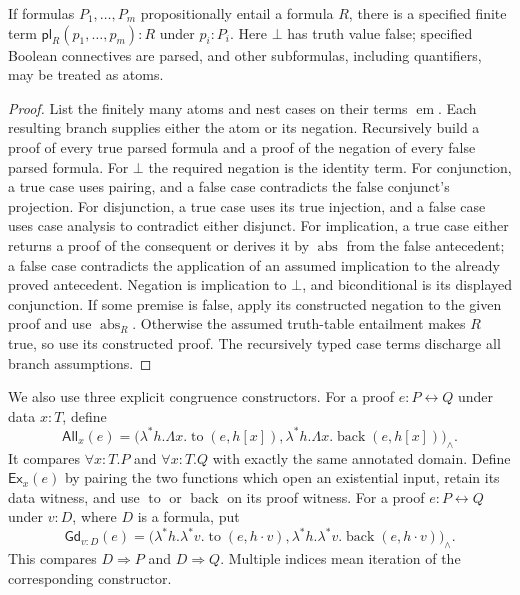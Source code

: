 \begin{lemma}
\label{lem:enc-propositional}
If formulas $P_1,\ldots,P_m$ propositionally entail a formula $R$, there
is a specified finite term
$\mathsf{pl}_R(p_1,\ldots,p_m):R$ under $p_i:P_i$.
Here $\bot$ has truth value false; specified Boolean connectives are
parsed, and other subformulas, including quantifiers, may be treated as
atoms.
\end{lemma}
\begin{proof}
List the finitely many atoms and nest cases on their terms
$\operatorname{em}$.  Each resulting branch supplies either the atom or
its negation.  Recursively build a proof of every true parsed formula and
a proof of the negation of every false parsed formula.  For $\bot$ the
required negation is the identity term.  For conjunction, a true case
uses pairing, and a false case contradicts the false conjunct's projection.
For disjunction, a true case uses its true injection, and a false case
uses case analysis to contradict either disjunct.  For implication, a true
case either returns a proof of the consequent or derives it by
$\operatorname{abs}$ from the false antecedent; a false case contradicts
the application of an assumed implication to the already proved antecedent.
Negation is implication to $\bot$, and biconditional is its displayed
conjunction.  If some premise is false, apply its constructed negation to
the given proof and use $\operatorname{abs}_R$.  Otherwise the assumed
truth-table entailment makes $R$ true, so use its constructed proof.
The recursively typed case terms discharge all branch assumptions.
\end{proof}

We also use three explicit congruence constructors.  For a proof
$e:P\leftrightarrow Q$ under data $x:T$, define
\[
 \mathsf{All}_x(e)=
 \bigl(\lambda^*h.\Lambda x.\operatorname{to}(e,h[x]),
       \lambda^*h.\Lambda x.\operatorname{back}(e,h[x])\bigr)_\land.
\]
It compares $\forall x:T.P$ and $\forall x:T.Q$ with exactly the same
annotated domain.  Define $\mathsf{Ex}_x(e)$ by pairing the two functions
which open an existential input, retain its data witness, and use
$\operatorname{to}$ or $\operatorname{back}$ on its proof witness.
For a proof $e:P\leftrightarrow Q$ under $v:D$, where $D$ is a formula,
put
\[
 \mathsf{Gd}_{v:D}(e)=
 \bigl(\lambda^*h.\lambda^*v.\operatorname{to}(e,h\cdot v),
       \lambda^*h.\lambda^*v.\operatorname{back}(e,h\cdot v)\bigr)_\land.
\]
This compares $D\Rightarrow P$ and $D\Rightarrow Q$.
Multiple indices mean iteration of the corresponding constructor.

